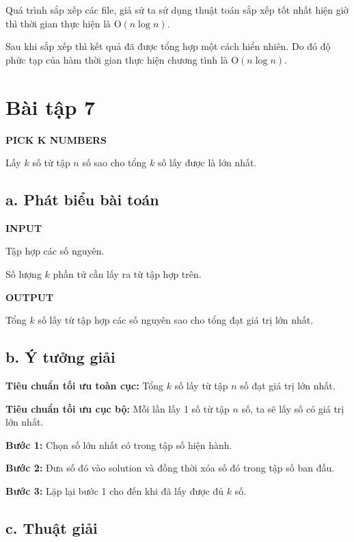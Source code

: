 \documentclass[12pt, a4paper, fleqn]{article}
\begin{document}
		Quá trình sắp xếp các file, giả sử ta sử dụng thuật toán sắp xếp tốt nhất hiện giờ thì thời gian thực hiện là O$(n \log n)$.
		
		Sau khi sắp xếp thì kết quả đã được tổng hợp một cách hiển nhiên. Do đó độ phức tạp của hàm thời gian thực hiện chương tình là O$(n \log n)$.
	
	\clearpage

	\section*{Bài tập 7}
	
	
	\textbf{PICK K NUMBERS}
	
	Lấy $k$ số từ tập $n$ số sao cho tổng $k$ số lấy được là lớn nhất.
	
	\subsection*{a. Phát biểu bài toán}
	
		\textbf{INPUT}
	
		Tập hợp các số nguyên.
	
		Số lượng $k$ phần tử cần lấy ra từ tập hợp trên.
	
		\textbf{OUTPUT}
	
		Tổng $k$ số lấy từ tập hợp các số nguyên sao cho tổng đạt giá trị lớn nhất.
	
	\subsection*{b. Ý tưởng giải}
	
	\textbf{Tiêu chuẩn tối ưu toàn cục:} Tổng $k$ số lấy từ tập $n$ số đạt giá trị lớn nhất.
	
	\textbf{Tiêu chuẩn tối ưu cục bộ:} Mỗi lần lấy 1 số từ tập $n$ số, ta sẽ lấy số có giá trị lớn nhất.
	
	\textbf{Bước 1:} Chọn số lớn nhất có trong tập số hiện hành.
	
	\textbf{Bước 2:} Đưa số đó vào solution và đồng thời xóa số đó trong tập số ban đầu.
	
	\textbf{Bước 3:} Lặp lại bước 1 cho đến khi đã lấy được đủ $k$ số.
	
	\subsection*{c. Thuật giải}
	
\end{document}
